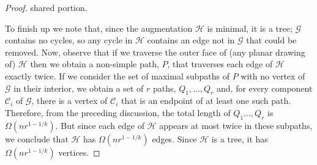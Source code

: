 \documentclass[a4paper, 11pt]{article}
\begin{document}
\begin{proof}
shared portion.

To finish up we note that, since the augmentation $\mathcal{H}$ is minimal,
it is a tree; $\mathcal G$ contains no cycles, so any cycle in $\mathcal H$ contains an edge not in $\mathcal G$ that could be removed.  Now, observe that if we traverse the outer face of (any planar drawing of) $\mathcal H$ then we obtain a non-simple path, $P$, that traverses each edge of $\mathcal{H}$ exactly twice. If we consider the set of maximal subpaths of $P$ with no vertex of $\mathcal G$ in their interior, we obtain a set of $r$ paths, $Q_1,\ldots,Q_{r}$ and, for every component $\mathcal C_i$ of $\mathcal G$, there is a vertex of $\mathcal C_i$ that is an endpoint of at least one such path.  Therefore, from the preceding discussion, the total length of $Q_1\ldots,Q_{r}$ is $\Omega(nr^{1-1/k})$.  But since each edge of $\mathcal H$ appears at most twice in these subpaths, we conclude that $\mathcal H$ has $\Omega(nr^{1-1/k})$ edges.  Since $\mathcal H$ is a tree, it has $\Omega(nr^{1-1/k})$ vertices.
\end{proof}




\end{document}
